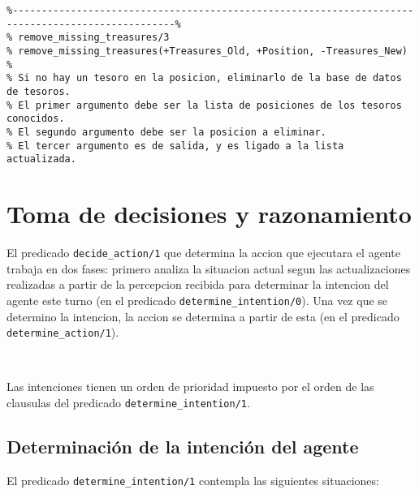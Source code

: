 \documentclass[a4paper,12pt]{report}
\begin{document}
\begin{scriptsize}
\begin{verbatim}
%--------------------------------------------------------------------------------------------------%
% remove_missing_treasures/3
% remove_missing_treasures(+Treasures_Old, +Position, -Treasures_New)
% 
% Si no hay un tesoro en la posicion, eliminarlo de la base de datos de tesoros.
% El primer argumento debe ser la lista de posiciones de los tesoros conocidos. 
% El segundo argumento debe ser la posicion a eliminar.
% El tercer argumento es de salida, y es ligado a la lista actualizada.
\end{verbatim}
\end{scriptsize}

\chapter{Toma de decisiones y razonamiento}

El predicado \texttt{decide\_action/1} que determina la accion que ejecutara el agente trabaja en 
dos fases: primero analiza la situacion actual segun las actualizaciones realizadas a partir de la
percepcion recibida para determinar la intencion del agente este turno (en el predicado 
\texttt{determine\_intention/0}). 
Una vez que se determino la intencion, la accion se determina a partir de esta (en el predicado
\texttt{determine\_action/1}). 

\ 

Las intenciones tienen un orden de prioridad impuesto por el orden de las clausulas del predicado
\texttt{determine\_intention/1}.

\section{Determinaci\'{o}n de la intenci\'{o}n del agente}

El predicado \texttt{determine\_intention/1} contempla las siguientes situaciones:
\end{document}
